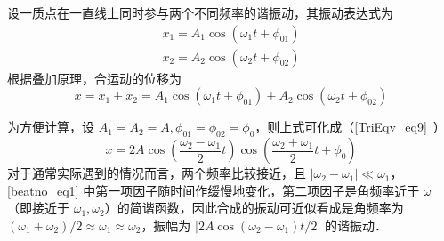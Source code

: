 设一质点在一直线上同时参与两个不同频率的谐振动，其振动表达式为
\begin{equation}
\begin{array}{l}x_{1}=A_{1} \cos \left(\omega_{1} t+\phi_{01}\right) \\ x_{2}=A_{2} \cos \left(\omega_{2} t+\phi_{02}\right)\end{array}
\end{equation}
根据叠加原理，合运动的位移为
\begin{equation}
x=x_{1}+x_{2}=A_{1} \cos \left(\omega_{1} t+\phi_{01}\right)+A_{2} \cos \left(\omega_{2} t+\phi_{02}\right)
\end{equation}

为方便计算，设 $A_1=A_2=A,\phi_{01}=\phi_{02}=\phi_{0}$，则上式可化成（\autoref{TriEqv_eq9}~）
\begin{equation} \label{beatno_eq1}
x=2 A \cos \left(\frac{\omega_{2}-\omega_{1}}{2} t\right) \cos \left(\frac{\omega_{2}+\omega_{1}}{2} t+\phi_{0}\right)
\end{equation}
对于通常实际遇到的情况而言，两个频率比较接近，且 $\left|\omega_{2}-\omega_{1}\right|\ll \omega_1$，\autoref{beatno_eq1} 中第一项因子随时间作缓慢地变化，第二项因子是角频率近于 $\omega$（即接近于 $\omega_1,\omega_2$）的简谐函数，因此合成的振动可近似看成是角频率为 $(\omega_{1}+\omega_{2})/2 \approx \omega_{1} \approx \omega_{2}$，振幅为 $\left | 2 A \cos (\omega_{2}-\omega_{1})t/{2} \right |$ 的谐振动．

